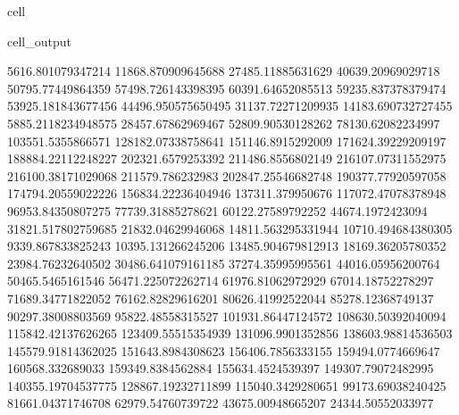 \documentclass[letterpaper,10pt,english]{jupyterBook}
\begin{document}
\begin{sphinxuseclass}{cell}
\begin{sphinxVerbatimOutput}
\begin{sphinxuseclass}{cell_output}
\begin{sphinxVerbatim}[commandchars=\\\{\}]
5616.801079347214  \PYGZhy{}11868.870909645688  \PYGZhy{}27485.11885631629  \PYGZhy{}40639.20969029718  \PYGZhy{}50795.77449864359  \PYGZhy{}57498.726143398395  \PYGZhy{}60391.64652085513  \PYGZhy{}59235.837378379474  \PYGZhy{}53925.181843677456  \PYGZhy{}44496.950575650495  \PYGZhy{}31137.72271209935  \PYGZhy{}14183.690732727455  5885.2118234948575  28457.67862969467  52809.90530128262  78130.62082234997  103551.5355866571  128182.07338758641  151146.8915292009  171624.39229209197  188884.22112248227  202321.6579253392  211486.8556802149  216107.07311552975  216100.38171029068  211579.786232983  202847.25546682748  190377.77920597058  174794.20559022226  156834.22236404946  137311.379950676  117072.47078378948  96953.84350807275  77739.31885278621  60122.27589792252  44674.1972423094  31821.517802759685  21832.04629946068  14811.563295331944  10710.494684380305  9339.867833825243  10395.131266245206  13485.904679812913  18169.36205780352  23984.76232640502  30486.641079161185  37274.35995995561  44016.05956200764  50465.5465161546  56471.225072262714  61976.81062972929  67014.18752278297  71689.34771822052  76162.82829616201  80626.41992522044  85278.12368749137  90297.38008803569  95822.48558315527  101931.86447124572  108630.50392040094  115842.42137626265  123409.55515354939  131096.9901352856  138603.98814536503  145579.91814362025  151643.8984308623  156406.7856333155  159494.0774669647  160568.332689033  159349.8384562884  155634.4524539397  149307.79072482995  140355.19704537775  128867.19232711899  115040.3429280651  99173.69038240425  81661.04371746708  62979.54760739722  43675.00948665207  24344.50552033977  

\end{sphinxVerbatim}
\end{sphinxuseclass}
\end{sphinxVerbatimOutput}
\end{sphinxuseclass}
\end{document}
